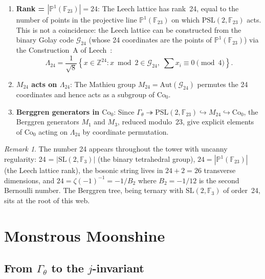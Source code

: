 \documentclass[12pt]{amsart}
\theoremstyle{definition}
\theoremstyle{remark}
\newtheorem{remark}[theorem]{Remark}
\newcommand{\SL}{\mathrm{SL}}
\newcommand{\PSL}{\mathrm{PSL}}
\newcommand{\Aut}{\mathrm{Aut}}
\newcommand{\Z}{\mathbb{Z}}
\newcommand{\PP}{\mathbb{P}}
\newcommand{\Gtheta}{\Gamma_\theta}
\begin{document}
\begin{enumerate}[label=(\alph*)]
\item \textbf{Rank = $|\PP^1(\mathbb{F}_{23})| = 24$}: The Leech lattice
  has rank~24, equal to the number of points in the projective line
  $\PP^1(\mathbb{F}_{23})$ on which $\PSL(2,\mathbb{F}_{23})$ acts.
  This is not a coincidence: the Leech lattice can be constructed from
  the binary Golay code $\mathcal{G}_{24}$ (whose 24 coordinates are
  the points of $\PP^1(\mathbb{F}_{23})$) via the
  Construction~A of Leech~\cite{leech}:
  \[
  \Lambda_{24} = \frac{1}{\sqrt{8}}\left\{
  x \in \Z^{24} : x \bmod 2 \in \mathcal{G}_{24},\;
  \sum x_i \equiv 0 \pmod{4}
  \right\}.
  \]

\item \textbf{$M_{24}$ acts on $\Lambda_{24}$}: The Mathieu group
  $M_{24} = \Aut(\mathcal{G}_{24})$ permutes the 24 coordinates and
  hence acts as a subgroup of $\mathrm{Co}_0$.

\item \textbf{Berggren generators in $\mathrm{Co}_0$}: Since
  $\Gtheta \twoheadrightarrow \PSL(2,\mathbb{F}_{23}) \hookrightarrow
  M_{24} \hookrightarrow \mathrm{Co}_0$, the Berggren generators $M_1$
  and $M_3$, reduced modulo~23, give explicit elements of
  $\mathrm{Co}_0$ acting on $\Lambda_{24}$ by coordinate permutation.
\end{enumerate}

\begin{remark}
The number 24 appears throughout the tower with uncanny regularity:
24 = $|\SL(2,\mathbb{F}_3)|$ (the binary tetrahedral group),
$24 = |\PP^1(\mathbb{F}_{23})|$ (the Leech lattice rank), the bosonic
string lives in $24+2 = 26$ transverse dimensions, and
$24 = \zeta(-1)^{-1} = -1/B_2$ where $B_2 = -1/12$ is the second
Bernoulli number.  The Berggren tree, being ternary with $\SL(2,\mathbb{F}_3)$
of order~24, sits at the root of this web.
\end{remark}

\section{Monstrous Moonshine}\label{sec:moonshine}

\subsection{From $\Gtheta$ to the $j$-invariant}
\end{document}
